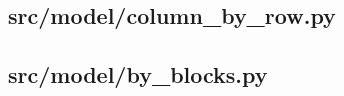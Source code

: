\subsection{src/model/column\_by\_row.py}
	
	\newpage

\subsection{src/model/by\_blocks.py}
	
	\newpage

